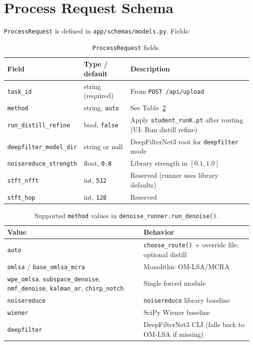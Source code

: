 \section{Process Request Schema}
\label{app:process_schema}

\texttt{ProcessRequest} is defined in \texttt{app/schemas/models.py}. Fields:

\begin{table}[H]
  \centering
  \caption{\texttt{ProcessRequest} fields.}
  \label{tab:process_fields}
  \begin{tabular}{lll}
    \toprule
    \textbf{Field} & \textbf{Type / default} & \textbf{Description} \\
    \midrule
    \texttt{task\_id} & string (required) & From \texttt{POST /api/upload} \\
    \texttt{method} & string, \texttt{auto} & See Table~\ref{tab:method_values} \\
    \texttt{run\_distill\_refine} & bool, \texttt{false} & Apply \texttt{student\_runK.pt} after routing (UI: Run distill refine) \\
    \texttt{deepfilter\_model\_dir} & string or null & DeepFilterNet3 root for \texttt{deepfilter} mode \\
    \texttt{noisereduce\_strength} & float, \texttt{0.8} & Library strength in $[0.1,1.0]$ \\
    \texttt{stft\_nfft} & int, \texttt{512} & Reserved (runner uses library defaults) \\
    \texttt{stft\_hop} & int, \texttt{128} & Reserved \\
    \bottomrule
  \end{tabular}
\end{table}

\begin{table}[H]
  \centering
  \caption{Supported \texttt{method} values in \texttt{denoise\_runner.run\_denoise()}.}
  \label{tab:method_values}
  \begin{tabular}{ll}
    \toprule
    \textbf{Value} & \textbf{Behavior} \\
    \midrule
    \texttt{auto} & \texttt{choose\_route()} + override file; optional distill \\
    \texttt{omlsa} / \texttt{base\_omlsa\_mcra} & Monolithic OM-LSA/MCRA \\
    \texttt{wpe\_omlsa}, \texttt{subspace\_denoise}, \texttt{nmf\_denoise}, \texttt{kalman\_ar}, \texttt{chirp\_notch} & Single forced module \\
    \texttt{noisereduce} & \texttt{noisereduce} library baseline \\
    \texttt{wiener} & SciPy Wiener baseline \\
    \texttt{deepfilter} & DeepFilterNet3 CLI (falls back to OM-LSA if missing) \\
    \bottomrule
  \end{tabular}
\end{table}

